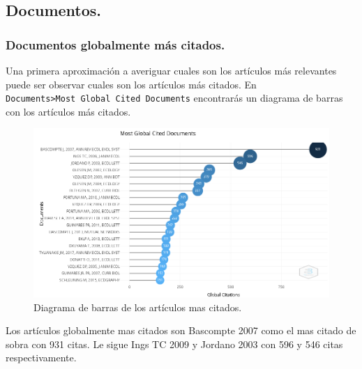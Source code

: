 \documentclass[
]{article}
\begin{document}
\hypertarget{documentos.}{%
\subsection{Documentos.}\label{documentos.}}

\hypertarget{documentos-globalmente-muxe1s-citados.}{%
\subsubsection{Documentos globalmente más
citados.}\label{documentos-globalmente-muxe1s-citados.}}

Una primera aproximación a averiguar cuales son los artículos más
relevantes puede ser observar cuales son los artículos más citados. En
\texttt{Documents\textgreater{}Most\ Global\ Cited\ Documents}
encontrarás un diagrama de barras con los artículos más citados.

\begin{figure}
\centering
\includegraphics{MostGlobalCitedDocuments.png}
\caption{Diagrama de barras de los artículos mas citados.}
\end{figure}

Los artículos globalmente mas citados son Bascompte 2007 como el mas
citado de sobra con 931 citas. Le sigue Ings TC 2009 y Jordano 2003 con
596 y 546 citas respectivamente.
\end{document}
